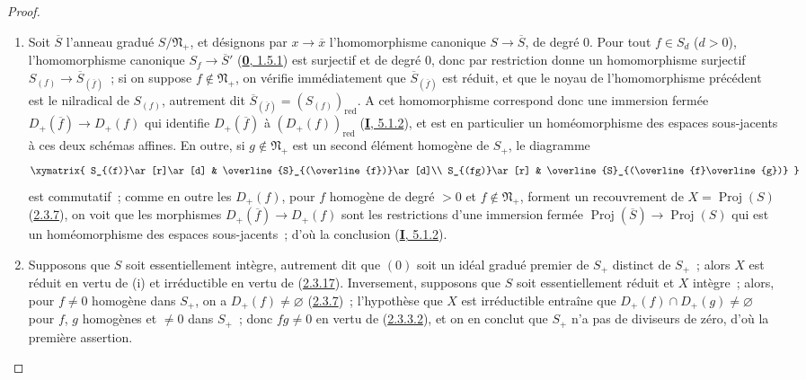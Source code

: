 \begin{proof}
\begin{enumerate}
  \item[\rm(i)] Soit $\overline{S}$ l'anneau gradué
    $S/\mathfrak{N}_+$, et désignons par $x\to\overline{x}$
    l'homomorphisme canonique $S\to\overline{S}$, de degré $0$. Pour tout
    $f\in S_d$ ($d>0$), l'homomorphisme canonique
    $S_f\to\overline{S}'$
    (\hyperref[0.1.5.1-fr]{\textbf{0}, 1.5.1}) est surjectif et de degré $0$, donc
    par restriction donne un homomorphisme surjectif
    $S_{(f)}\to\overline{S}_{(\overline{f})}$~; si on suppose
    $f\notin\mathfrak{N}_+$, on vérifie immédiatement que
    $\overline{S}_{(\overline{f})}$ est réduit, et que le noyau de
    l'homomorphisme précédent est le nilradical de $S_{(f)}$, autrement dit
    $\overline{S}_{(\overline{f})}=(S_{(f)})_{\mathrm{red}}$. A cet
    homomorphisme correspond donc une immersion fermée
    $D_+(\overline{f})\to D_+(f)$ qui identifie $D_+(\overline{f})$ à
    $(D_+(f))_{\mathrm{red}}$ (\hyperref[I.5.1.2-fr]{\textbf{I}, 5.1.2}), et est en
    particulier un homéomorphisme des espaces sous-jacents à ces deux
    schémas affines. En outre, si $g\notin\mathfrak{N}_+$ est un second
    élément homogène de $S_+$, le diagramme
    \[
      \xymatrix{
        S_{(f)}\ar[r]\ar[d]
        & \overline{S}_{(\overline{f})}\ar[d]\\
        S_{(fg)}\ar[r]
        & \overline{S}_{(\overline{f}\overline{g})}
      }
    \]
    est commutatif~; comme en outre les $D_+(f)$, pour $f$ homogène de
    degré $>0$ et $f\notin\mathfrak{N}_+$, forment un recouvrement de
    $X=\operatorname{Proj}(S)$ (\hyperref[II.2.3.7-fr]{2.3.7}), on voit
    que les morphismes $D_+(\overline{f})\to D_+(f)$ sont les restrictions
    d'une immersion fermée
    $\operatorname{Proj}(\overline{S})\to\operatorname{Proj}(S)$ qui est
    un homéomorphisme des espaces sous-jacents~; d'où la conclusion
    (\hyperref[I.5.1.2-fr]{\textbf{I}, 5.1.2}).
  \item[\rm(ii)] Supposons que $S$ soit essentiellement intègre, autrement
    dit que $(0)$ soit un idéal gradué premier de $S_+$ distinct de $S_+$~;
    alors $X$ est réduit en vertu de (i) et irréductible en vertu de
    (\hyperref[II.2.3.17-fr]{2.3.17}). Inversement, supposons que $S$ soit
    essentiellement réduit et $X$ intègre~; alors, pour $f\neq0$ homogène
    dans $S_+$, on a $D_+(f)\neq\varnothing$
    (\hyperref[II.2.3.7-fr]{2.3.7})~; l'hypothèse que $X$ est irréductible
    entraîne que $D_+(f)\cap D_+(g)\neq\varnothing$ pour $f$, $g$
    homogènes et $\neq0$ dans $S_+$~; donc $fg\neq0$ en vertu de
    (\hyperref[II.2.3.3.2-fr]{2.3.3.2}), et on en conclut que $S_+$ n'a pas
    de diviseurs de zéro, d'où la première assertion.
\end{enumerate}
\end{proof}

